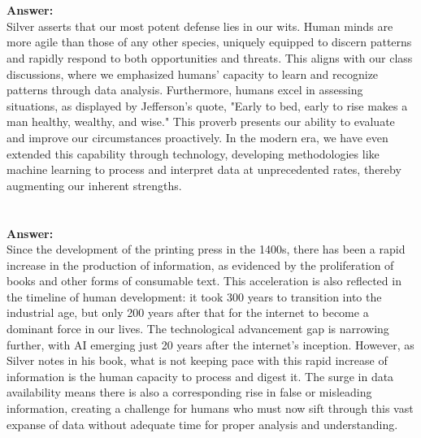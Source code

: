 \documentclass[12pt]{article}
\begin{document}
\begin{enumerate}
 \\ \\
\textbf{Answer:} \\ 
Silver asserts that our most potent defense lies in our wits. Human minds are more agile than those of any other species, uniquely equipped to discern patterns and rapidly respond to both opportunities and threats. This aligns with our class discussions, where we emphasized humans' capacity to learn and recognize patterns through data analysis. Furthermore, humans excel in assessing situations, as displayed by Jefferson's quote, "Early to bed, early to rise makes a man healthy, wealthy, and wise." This proverb presents our ability to evaluate and improve our circumstances proactively. In the modern era, we have even extended this capability through technology, developing methodologies like machine learning to process and interpret data at unprecedented rates, thereby augmenting our inherent strengths. \\





 \\ \\
\textbf{Answer:} \\ 
Since the development of the printing press in the 1400s, there has been a rapid increase in the production of information, as evidenced by the proliferation of books and other forms of consumable text. This acceleration is also reflected in the timeline of human development: it took 300 years to transition into the industrial age, but only 200 years after that for the internet to become a dominant force in our lives. The technological advancement gap is narrowing further, with AI emerging just 20 years after the internet's inception. However, as Silver notes in his book, what is not keeping pace with this rapid increase of information is the human capacity to process and digest it. The surge in data availability means there is also a corresponding rise in false or misleading information, creating a challenge for humans who must now sift through this vast expanse of data without adequate time for proper analysis and understanding. \\
 \\ \\ \\


\end{enumerate}
\end{document}
